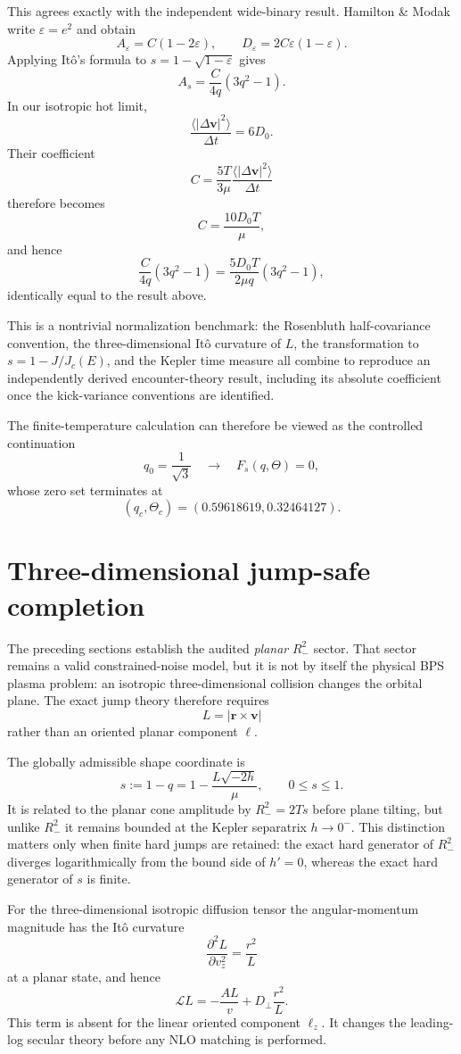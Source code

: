 \documentclass[11pt]{article}
\theoremstyle{remark}
\newcommand{\1}{\mathbf 1}
\begin{document}
This agrees exactly with the independent wide-binary result.  Hamilton \&
Modak write $\varepsilon=e^2$ and obtain
\cite{HamiltonModak2024}
\[
A_\varepsilon=C(1-2\varepsilon),
\qquad
D_\varepsilon=2C\varepsilon(1-\varepsilon).
\]
Applying It\^o's formula to
$s=1-\sqrt{1-\varepsilon}$ gives
\[
A_s=\frac{C}{4q}(3q^2-1).
\]
In our isotropic hot limit,
\[
\frac{\langle|\Delta\bm v|^2\rangle}{\Delta t}=6D_0.
\]
Their coefficient
\[
C
=
\frac{5T}{3\mu}
\frac{\langle|\Delta\bm v|^2\rangle}{\Delta t}
\]
therefore becomes
\[
C=\frac{10D_0T}{\mu},
\]
and hence
\[
\frac{C}{4q}(3q^2-1)
=
\frac{5D_0T}{2\mu q}(3q^2-1),
\]
identically equal to the result above.

This is a nontrivial normalization benchmark: the Rosenbluth
half-covariance convention, the three-dimensional It\^o curvature of $L$,
the transformation to $s=1-J/J_c(E)$, and the Kepler time measure all combine
to reproduce an independently derived encounter-theory result, including its
absolute coefficient once the kick-variance conventions are identified.

The finite-temperature calculation can therefore be viewed as the controlled
continuation
\[
q_0=\frac1{\sqrt3}
\quad\longrightarrow\quad
F_s(q,\Theta)=0,
\]
whose zero set terminates at
\[
(q_c,\Theta_c)=(0.59618619,0.32464127).
\]


\section{Three-dimensional jump-safe completion}

The preceding sections establish the audited \emph{planar} $R_-^2$ sector.
That sector remains a valid constrained-noise model, but it is not by itself
the physical BPS plasma problem: an isotropic three-dimensional collision
changes the orbital plane.  The exact jump theory therefore requires
\[
L=|\bm r\times\bm v|
\]
rather than an oriented planar component $\ell$.

The globally admissible shape coordinate is
\[
\boxed{
s:=1-q
=
1-\frac{L\sqrt{-2h}}{\mu},
\qquad 0\le s\le1.
}
\]
It is related to the planar cone amplitude by $R_-^2=2Ts$ before plane
tilting, but unlike $R_-^2$ it remains bounded at the Kepler separatrix
$h\to0^-$.  This distinction matters only when finite hard jumps are retained:
the exact hard generator of $R_-^2$ diverges logarithmically from the bound
side of $h'=0$, whereas the exact hard generator of $s$ is finite.

For the three-dimensional isotropic diffusion tensor the angular-momentum
magnitude has the It\^o curvature
\[
\frac{\partial^2 L}{\partial v_z^2}=\frac{r^2}{L}
\]
at a planar state, and hence
\[
\mathcal L L
=
-\frac{A L}{v}
+
D_\perp\frac{r^2}{L}.
\]
This term is absent for the linear oriented component $\ell_z$.  It changes
the leading-log secular theory before any NLO matching is performed.
\end{document}
